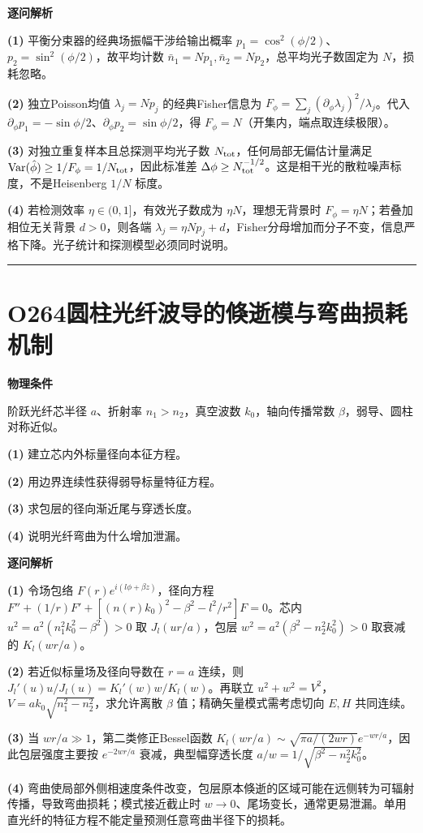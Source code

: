 \documentclass[UTF8,a4paper,11pt,oneside,openany]{ctexbook}
\begin{document}
\par\medskip\noindent\textbf{逐问解析}
\par\noindent\textbf{(1)} 平衡分束器的经典场振幅干涉给输出概率 \(p_1=\cos^2(\phi/2)\)、\(p_2=\sin^2(\phi/2)\)，故平均计数 \(\bar n_1=Np_1,\bar n_2=Np_2\)，总平均光子数固定为 \(N\)，损耗忽略。
\par\noindent\textbf{(2)} 独立Poisson均值 \(\lambda_j=Np_j\) 的经典Fisher信息为 \(F_\phi=\sum_j(\partial_\phi\lambda_j)^2/\lambda_j\)。代入 \(\partial_\phi p_1=-\sin\phi/2\)、\(\partial_\phi p_2=\sin\phi/2\)，得 \(F_\phi=N\)（开集内，端点取连续极限）。
\par\noindent\textbf{(3)} 对独立重复样本且总探测平均光子数 \(N_{\rm tot}\)，任何局部无偏估计量满足 \(\operatorname{Var}(\hat\phi)\ge1/F_\phi=1/N_{\rm tot}\)，因此标准差 \(\Delta\phi\ge N_{\rm tot}^{-1/2}\)。这是相干光的散粒噪声标度，不是Heisenberg \(1/N\) 标度。
\par\noindent\textbf{(4)} 若检测效率 \(\eta\in(0,1]\)，有效光子数成为 \(\eta N\)，理想无背景时 \(F_\phi=\eta N\)；若叠加相位无关背景 \(d>0\)，则各端 \(\lambda_j=\eta Np_j+d\)，Fisher分母增加而分子不变，信息严格下降。光子统计和探测模型必须同时说明。

\par\bigskip\hrule\bigskip
\section*{O264\quad 圆柱光纤波导的倏逝模与弯曲损耗机制}
\textbf{物理条件}\par 阶跃光纤芯半径 \(a\)、折射率 \(n_1>n_2\)，真空波数 \(k_0\)，轴向传播常数 \(\beta\)，弱导、圆柱对称近似。
\par\noindent\textbf{(1)} 建立芯内外标量径向本征方程。
\par\noindent\textbf{(2)} 用边界连续性获得弱导标量特征方程。
\par\noindent\textbf{(3)} 求包层的径向渐近尾与穿透长度。
\par\noindent\textbf{(4)} 说明光纤弯曲为什么增加泄漏。

\par\medskip\noindent\textbf{逐问解析}
\par\noindent\textbf{(1)} 令场包络 \(F(r)e^{i(l\phi+\beta z)}\)，径向方程 \(F''+(1/r)F'+[(n(r)k_0)^2-\beta^2-l^2/r^2]F=0\)。芯内 \(u^2=a^2(n_1^2k_0^2-\beta^2)>0\) 取 \(J_l(ur/a)\)，包层 \(w^2=a^2(\beta^2-n_2^2k_0^2)>0\) 取衰减的 \(K_l(wr/a)\)。
\par\noindent\textbf{(2)} 若近似标量场及径向导数在 \(r=a\) 连续，则 \(J_l'(u)u/J_l(u)=K_l'(w)w/K_l(w)\)。再联立 \(u^2+w^2=V^2\)，\(V=ak_0\sqrt{n_1^2-n_2^2}\)，求允许离散 \(\beta\) 值；精确矢量模式需考虑切向 \(E,H\) 共同连续。
\par\noindent\textbf{(3)} 当 \(wr/a\gg1\)，第二类修正Bessel函数 \(K_l(wr/a)\sim\sqrt{\pi a/(2wr)}e^{-wr/a}\)，因此包层强度主要按 \(e^{-2wr/a}\) 衰减，典型幅穿透长度 \(a/w=1/\sqrt{\beta^2-n_2^2k_0^2}\)。
\par\noindent\textbf{(4)} 弯曲使局部外侧相速度条件改变，包层原本倏逝的区域可能在远侧转为可辐射传播，导致弯曲损耗；模式接近截止时 \(w\to0\)、尾场变长，通常更易泄漏。单用直光纤的特征方程不能定量预测任意弯曲半径下的损耗。
\end{document}
